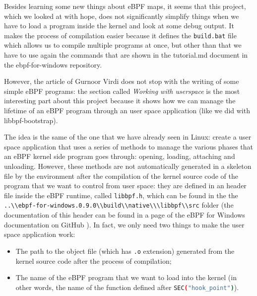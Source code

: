 Besides learning some new things about eBPF maps, it seems that this project, which we looked at with hope, does not significantly simplify things when we have to load a program inside the kernel and look at some debug output.
It makes the process of compilation easier because it defines the \colorbox{backcolour}{\lstinline[style=commandline, language=bash, breaklines=true]|build.bat|} file which allows us to compile multiple programs at once, but other than that we have to use again the commands that are shown in the tutorial.md document in the ebpf-for-windows repository.

However, the article of Gurnoor Virdi does not stop with the writing of some simple eBPF programs: the section called \textit{Working with userspace} is the most interesting part about this project because it shows how we can manage the lifetime of an eBPF program through an user space application (like we did with libbpf-bootstrap).

The idea is the same of the one that we have already seen in Linux: create a user space application that uses a series of methods to manage the various phases that an eBPF kernel side program goes through: opening, loading, attaching and unloading.
However, these methods are not automatically generated in a skeleton file by the environment after the compilation of the kernel source code of the program that we want to control from user space: they are defined in an header file inside the eBPF runtime, called \colorbox{backcolour}{\lstinline[style=commandline, language=bash, breaklines=true]|libbpf.h|}, which can be found in the the \colorbox{backcolour}{\lstinline[style=commandline, language=bash, breaklines=true]|..\\ebpf-for-windows.0.9.0\\build\\native\\\libbpf\\src|} folder (the documentation of this header can be found in a page of the eBPF for Windows documentation on GitHub \cite{eBPFWinlibbpfHeader}).
In fact, we only need two things to make the user space application work:

\begin{itemize}
	\item 
		The path to the object file (which has \colorbox{backcolour}{\lstinline[style=commandline, language=bash, breaklines=true]|.o|} extension) generated from the kernel source code after the process of compilation;
	\item 
		The name of the eBPF program that we want to load into the kernel (in other words, the name of the function defined after \colorbox{backcolour}{\lstinline[style=commandline, language=bash, breaklines=true]|SEC("hook_point")|}).
\end{itemize}

